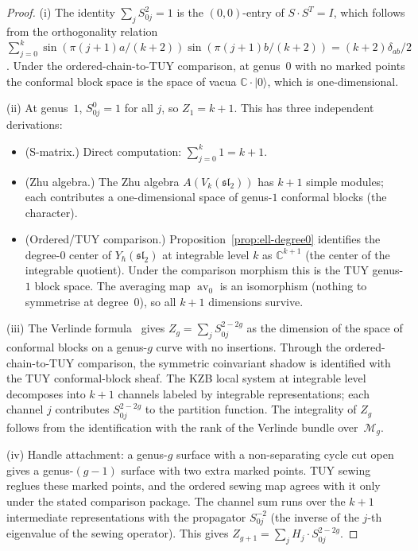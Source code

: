 \documentclass[11pt,reqno]{amsart}
\theoremstyle{definition}
\theoremstyle{remark}
\newcommand{\cM}{\mathcal{M}}
\DeclareMathOperator{\av}{av}
\newcommand{\CC}{\mathbb{C}}
\numberwithin{equation}{section}
\begin{document}
\begin{proof}
\textup{(i)} The identity $\sum_j S_{0j}^2 = 1$ is the
$(0,0)$-entry of $S \cdot S^T = I$, which follows from the
orthogonality relation
$\sum_{j=0}^{k} \sin(\pi(j{+}1)a/(k{+}2))
\sin(\pi(j{+}1)b/(k{+}2)) = (k{+}2)\delta_{ab}/2$.
Under the ordered-chain-to-TUY comparison, at genus~$0$ with no
marked points the conformal block space is the space of
vacua $\CC \cdot |0\rangle$, which is one-dimensional.

\textup{(ii)} At genus~$1$, $S_{0j}^0 = 1$ for all $j$,
so $Z_1 = k + 1$. This has three independent derivations:
\begin{itemize}
\item \textup{(S-matrix.)} Direct computation:
  $\sum_{j=0}^{k} 1 = k + 1$.
\item \textup{(Zhu algebra.)} The Zhu algebra
  $A(V_k(\mathfrak{sl}_2))$ has $k+1$ simple modules;
  each contributes a one-dimensional space of genus-$1$
  conformal blocks (the character).
\item \textup{(Ordered/TUY comparison.)}
  Proposition~\ref{prop:ell-degree0} identifies the
  degree-$0$ center of $Y_\hbar(\mathfrak{sl}_2)$ at
  integrable level $k$ as $\CC^{k+1}$ (the center of
  the integrable quotient). Under the comparison morphism this is
  the TUY genus-$1$ block space. The averaging map $\av_0$ is
  an isomorphism (nothing to symmetrise at degree~$0$),
  so all $k+1$ dimensions survive.
\end{itemize}

\textup{(iii)} The Verlinde formula~\cite{Verlinde88} gives
$Z_g = \sum_j S_{0j}^{2-2g}$ as the dimension of the space
of conformal blocks on a genus-$g$ curve with no insertions.
Through the ordered-chain-to-TUY comparison, the symmetric
coinvariant shadow is identified with the TUY conformal-block sheaf.
The
KZB local system at integrable level decomposes into $k+1$
channels labeled by integrable representations; each channel
$j$ contributes $S_{0j}^{2-2g}$ to the partition function.
The integrality of $Z_g$ follows from the identification
with the rank of the Verlinde bundle over~$\cM_g$.

\textup{(iv)} Handle attachment: a genus-$g$ surface with
a non-separating cycle cut open gives a genus-$(g{-}1)$
surface with two extra marked points. TUY sewing reglues these
marked points, and the ordered sewing map agrees with it only under
the stated comparison package. The channel sum runs over the $k+1$
intermediate representations with the propagator
$S_{0j}^{-2}$ (the inverse of the $j$-th eigenvalue of
the sewing operator). This gives
$Z_{g+1} = \sum_j H_j \cdot S_{0j}^{2-2g}$.


\end{proof}
\end{document}

